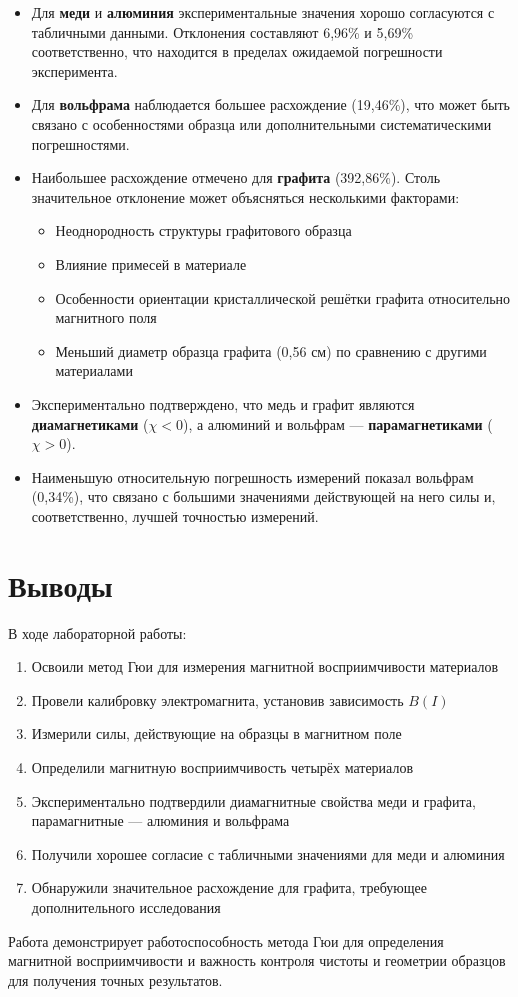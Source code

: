 \documentclass[a4paper]{article}
\begin{document}
\begin{itemize}
    \item Для \textbf{меди} и \textbf{алюминия} экспериментальные значения хорошо согласуются с табличными данными. Отклонения составляют 6,96\% и 5,69\% соответственно, что находится в пределах ожидаемой погрешности эксперимента.
    
    \item Для \textbf{вольфрама} наблюдается большее расхождение (19,46\%), что может быть связано с особенностями образца или дополнительными систематическими погрешностями.
    
    \item Наибольшее расхождение отмечено для \textbf{графита} (392,86\%). Столь значительное отклонение может объясняться несколькими факторами:
    \begin{itemize}
        \item Неоднородность структуры графитового образца
        \item Влияние примесей в материале
        \item Особенности ориентации кристаллической решётки графита относительно магнитного поля
        \item Меньший диаметр образца графита (0,56 см) по сравнению с другими материалами
    \end{itemize}
    
    \item Экспериментально подтверждено, что медь и графит являются \textbf{диамагнетиками} ($\chi < 0$), а алюминий и вольфрам --- \textbf{парамагнетиками} ($\chi > 0$).
    
    \item Наименьшую относительную погрешность измерений показал вольфрам (0,34\%), что связано с большими значениями действующей на него силы и, соответственно, лучшей точностью измерений.
\end{itemize}

\section{Выводы}

В ходе лабораторной работы:

\begin{enumerate}
    \item Освоили метод Гюи для измерения магнитной восприимчивости материалов
    \item Провели калибровку электромагнита, установив зависимость $B(I)$
    \item Измерили силы, действующие на образцы в магнитном поле
    \item Определили магнитную восприимчивость четырёх материалов
    \item Экспериментально подтвердили диамагнитные свойства меди и графита, парамагнитные --- алюминия и вольфрама
    \item Получили хорошее согласие с табличными значениями для меди и алюминия
    \item Обнаружили значительное расхождение для графита, требующее дополнительного исследования
\end{enumerate}

Работа демонстрирует работоспособность метода Гюи для определения магнитной восприимчивости и важность контроля чистоты и геометрии образцов для получения точных результатов.
\end{document}
